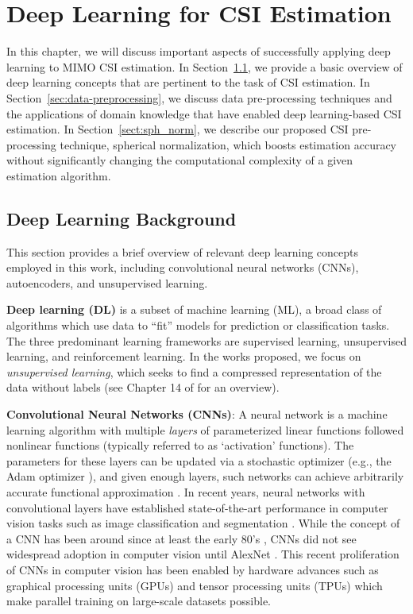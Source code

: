 \chapter{Deep Learning for CSI Estimation}
\label{chap:sph_norm}

In this chapter, we will discuss important aspects of successfully applying deep learning to MIMO CSI estimation. In Section~\ref{sect:dl_overview}, we provide a basic overview of deep learning concepts that are pertinent to the task of CSI estimation. In Section~\ref{sec:data-preprocessing}, we discuss data pre-processing techniques and the applications of domain knowledge that have enabled deep learning-based CSI estimation. In Section~\ref{sect:sph_norm}, we describe our proposed CSI pre-processing technique, spherical normalization, which boosts estimation accuracy without significantly changing the computational complexity of a given estimation algorithm. 

\section{Deep Learning Background}
\label{sect:dl_overview}

This section provides a brief overview of relevant deep learning concepts employed in this work, including convolutional neural networks (CNNs), autoencoders, and unsupervised learning.

\textbf{Deep learning (DL)} is a subset of machine learning (ML), a broad class of algorithms which use data to ``fit'' models for prediction or classification tasks. The three predominant learning frameworks are supervised learning, unsupervised learning, and reinforcement learning. In the works proposed, we focus on \emph{unsupervised learning}, which seeks to find a compressed representation of the data without labels (see Chapter 14 of \cite{ref:Hastie2016Elements} for an overview).

\textbf{Convolutional Neural Networks (CNNs)}: A neural network is a machine learning algorithm with multiple \emph{layers} of parameterized linear functions followed nonlinear functions (typically referred to as `activation' functions). The parameters for these layers can be updated via a stochastic optimizer (e.g., the Adam optimizer \cite{ref:Kingma2014ADAM}), and given enough layers, such networks can achieve arbitrarily accurate functional approximation \cite{ref:Hecht1992TheoryBackprop}. In recent years, neural networks with convolutional layers have established state-of-the-art performance in computer vision tasks such as image classification \cite{ref:Sabour2017Dynamic} and segmentation \cite{ref:He2017Mask}. While the concept of a CNN has been around since at least the early 80's \cite{ref:fukushima1980neocognitron}, CNNs did not see widespread adoption in computer vision until AlexNet \cite{ref:krizhevsky2012imagenet}. This recent proliferation of CNNs in computer vision has been enabled by hardware advances  such as graphical processing units (GPUs) and tensor processing units (TPUs) which make parallel training on large-scale datasets possible.


